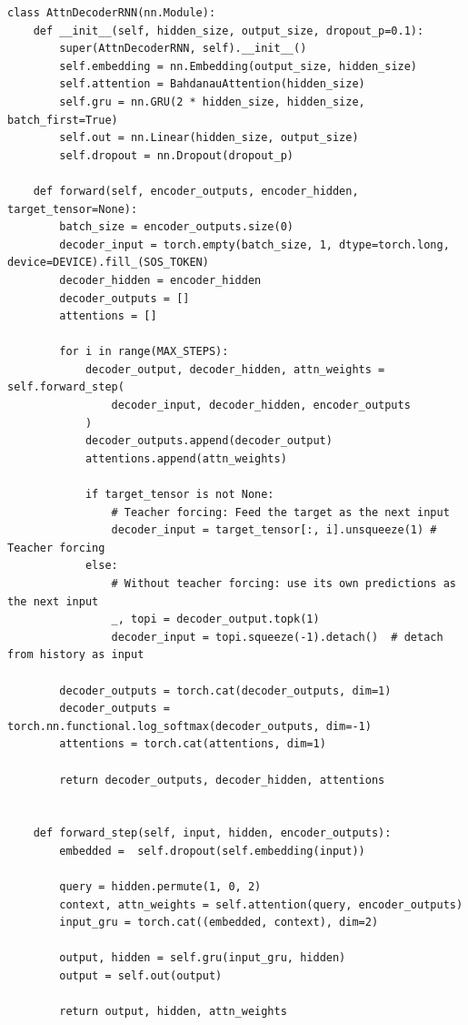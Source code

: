 \bgroup
    \begin{verbatim}
class AttnDecoderRNN(nn.Module):
    def __init__(self, hidden_size, output_size, dropout_p=0.1):
        super(AttnDecoderRNN, self).__init__()
        self.embedding = nn.Embedding(output_size, hidden_size)
        self.attention = BahdanauAttention(hidden_size)
        self.gru = nn.GRU(2 * hidden_size, hidden_size, batch_first=True)
        self.out = nn.Linear(hidden_size, output_size)
        self.dropout = nn.Dropout(dropout_p)

    def forward(self, encoder_outputs, encoder_hidden, target_tensor=None):
        batch_size = encoder_outputs.size(0)
        decoder_input = torch.empty(batch_size, 1, dtype=torch.long, device=DEVICE).fill_(SOS_TOKEN)
        decoder_hidden = encoder_hidden
        decoder_outputs = []
        attentions = []

        for i in range(MAX_STEPS):
            decoder_output, decoder_hidden, attn_weights = self.forward_step(
                decoder_input, decoder_hidden, encoder_outputs
            )
            decoder_outputs.append(decoder_output)
            attentions.append(attn_weights)

            if target_tensor is not None:
                # Teacher forcing: Feed the target as the next input
                decoder_input = target_tensor[:, i].unsqueeze(1) # Teacher forcing
            else:
                # Without teacher forcing: use its own predictions as the next input
                _, topi = decoder_output.topk(1)
                decoder_input = topi.squeeze(-1).detach()  # detach from history as input

        decoder_outputs = torch.cat(decoder_outputs, dim=1)
        decoder_outputs = torch.nn.functional.log_softmax(decoder_outputs, dim=-1)
        attentions = torch.cat(attentions, dim=1)

        return decoder_outputs, decoder_hidden, attentions


    def forward_step(self, input, hidden, encoder_outputs):
        embedded =  self.dropout(self.embedding(input))

        query = hidden.permute(1, 0, 2)
        context, attn_weights = self.attention(query, encoder_outputs)
        input_gru = torch.cat((embedded, context), dim=2)

        output, hidden = self.gru(input_gru, hidden)
        output = self.out(output)

        return output, hidden, attn_weights
    \end{verbatim}
    \label{lst:seq2seq_decoder}
    \egroup
    \bigskip
